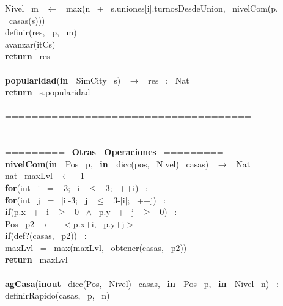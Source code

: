 \indent \indent \indent \indent Nivel \ m \ $\leftarrow$ \ max(n \ + \ s.uniones[i].turnosDesdeUnion, \ nivelCom(p, \ casas(s)))\\
\indent \indent \indent \indent definir(res, \ p, \ m)\\
\indent \indent \indent avanzar(itCs)\\
\indent \textbf{return} \ res\\
\noindent\makebox[\linewidth]{\rule{\textwidth}{0.4pt}}
\\
\noindent\makebox[\linewidth]{\rule{\textwidth}{0.4pt}}
\textbf{popularidad}(\textbf{in \ }SimCity \ s) \ $\rightarrow $ \ res \ : \ Nat\\
\indent \textbf{return} \ s.popularidad\\
\noindent\makebox[\linewidth]{\rule{\textwidth}{0.4pt}}
\\
===================================== \ \\
\\
\\
========= \ \textbf{Otras \ Operaciones} \ =========\\
\noindent\makebox[\linewidth]{\rule{\textwidth}{0.4pt}}
\textbf{nivelCom}(\textbf{in \ }Pos \ p, \ \textbf{in \ }dicc(pos, \ Nivel) \ casas) \ $\rightarrow $ \ Nat\\
\indent nat \ maxLvl \ $\leftarrow$ \ 1\\
\indent \textbf{for}(int \ i \ = \ -3; \ i \ $\leq$ \ 3; \ ++i) \ :\\
\indent \indent \textbf{for}(int \ j \ = \ $\mid$i$\mid$-3; \ j \ $\leq$ \ 3-$\mid$i$\mid$; \ ++j) \ :\\
\indent \indent \indent \textbf{if}(p.x \ + \ i \ $\geq$ \ 0 \ $\wedge$ \ p.y \ + \ j \ $\geq$ \ 0) \ :\\
\indent \indent \indent \indent Pos \ p2 \ $\leftarrow$ \ $<$p.x+i, \ p.y+j$>$ \ \\
\indent \indent \indent \indent \textbf{if}(def?(casas, \ p2)) \ :\\
\indent \indent \indent \indent \indent maxLvl \ = \ max(maxLvl, \ obtener(casas, \ p2))\\
\indent \textbf{return} \ maxLvl\\
\noindent\makebox[\linewidth]{\rule{\textwidth}{0.4pt}}
\\
\noindent\makebox[\linewidth]{\rule{\textwidth}{0.4pt}}
\textbf{agCasa}(\textbf{inout} \ dicc(Pos, \ Nivel) \ casas, \ \textbf{in \ }Pos \ p, \ \textbf{in \ }Nivel \ n) \ :\\
\indent definirRapido(casas, \ p, \ n) \ 
